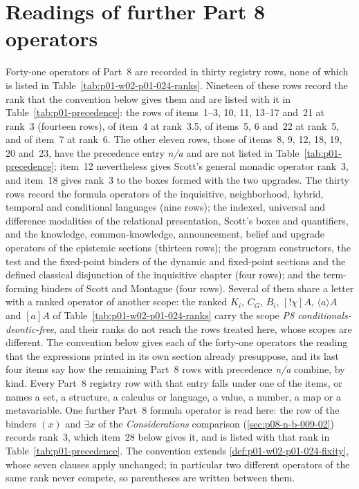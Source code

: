 \section{Readings of further Part 8 operators}
\label{sec:p01-w02b-p01-012-p8-readings}

Forty-one operators of Part~8 are recorded in thirty registry rows, none
of which is listed in Table~\ref{tab:p01-w02-p01-024-ranks}.  Nineteen of
these rows record the rank that the convention below gives them and are
listed with it in Table~\ref{tab:p01-precedence}: the rows of items~1--3,
10, 11, 13--17 and~21 at rank~3 (fourteen rows), of item~4 at rank~3.5,
of items~5, 6 and~22 at rank~5, and of item~7 at rank~6.  The other eleven
rows, those of items~8, 9, 12, 18, 19, 20 and~23, have the precedence
entry \emph{n/a} and are not listed in Table~\ref{tab:p01-precedence};
item~12 nevertheless gives Scott's general monadic operator rank~3, and
item~18 gives rank~3 to the boxes formed with the two upgrades.
The thirty rows record the formula operators of the inquisitive,
neighborhood, hybrid, temporal and conditional languages (nine rows); the
indexed, universal and
difference modalities of the relational presentation, Scott's boxes and
quantifiers, and the knowledge, common-knowledge, announcement, belief and
upgrade operators of the epistemic sections (thirteen rows); the program
constructors, the test and the fixed-point binders of the dynamic and
fixed-point sections and the defined classical disjunction of the
inquisitive chapter (four rows); and the term-forming binders of Scott and
Montague (four rows).  Several of them share a letter with a ranked
operator of another scope: the ranked \(K_i\), \(C_G\), \(B_i\),
\([!\chi]A\), \(\langle a\rangle A\) and \([a]A\) of
Table~\ref{tab:p01-w02-p01-024-ranks} carry the scope
\emph{P8 conditionals-deontic-free}, and their ranks do not reach the
rows treated here, whose scopes are different.  The convention below gives
each of the forty-one operators the reading that the expressions printed in
its own section already presuppose, and its last four items say how the
remaining Part~8 rows with precedence \emph{n/a} combine, by kind.  Every
Part~8 registry row with that entry falls under one of the items, or names
a set, a structure, a calculus or language, a value, a number, a map or a
metavariable.
One further Part~8 formula operator is read here: the row of the binders
\((x)\) and \(\exists x\) of the \emph{Considerations} comparison
(\cref{sec:p08-n-b-009-02}) records rank~3, which item~28 below gives it,
and is listed with that rank in Table~\ref{tab:p01-precedence}.
The convention extends \cref{def:p01-w02-p01-024-fixity}, whose seven
clauses apply unchanged; in particular two different operators of the same
rank never compete, so parentheses are written between them.

